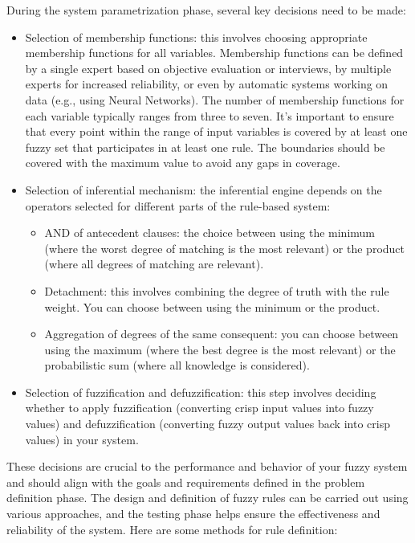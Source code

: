 \documentclass[12pt, a4paper]{report}
\begin{document}
    During the system parametrization phase, several key decisions need to be made:
    \begin{itemize}
        \item Selection of membership functions: this involves choosing appropriate membership functions for all variables. 
            Membership functions can be defined by a single expert based on objective evaluation or interviews, by multiple experts for increased reliability, or even by automatic systems working on data (e.g., using Neural Networks). 
            The number of membership functions for each variable typically ranges from three to seven. 
            It's important to ensure that every point within the range of input variables is covered by at least one fuzzy set that participates in at least one rule. 
            The boundaries should be covered with the maximum value to avoid any gaps in coverage.
        \item Selection of inferential mechanism: the inferential engine depends on the operators selected for different parts of the rule-based system:
            \begin{itemize}
                \item AND of antecedent clauses: the choice between using the minimum (where the worst degree of matching is the most relevant) or the product (where all degrees of matching are relevant).
                \item Detachment: this involves combining the degree of truth with the rule weight. 
                    You can choose between using the minimum or the product.
                \item Aggregation of degrees of the same consequent: you can choose between using the maximum (where the best degree is the most relevant) or the probabilistic sum (where all knowledge is considered).
            \end{itemize}
        \item Selection of fuzzification and defuzzification: this step involves deciding whether to apply fuzzification (converting crisp input values into fuzzy values) and defuzzification (converting fuzzy output values back into crisp values) in your system.
    \end{itemize}
    These decisions are crucial to the performance and behavior of your fuzzy system and should align with the goals and requirements defined in the problem definition phase.
    The design and definition of fuzzy rules can be carried out using various approaches, and the testing phase helps ensure the effectiveness and reliability of the system. Here are some methods for rule definition: 
\end{document}
